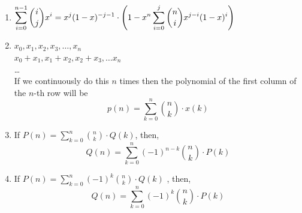 \begin{enumerate}
          \\= n!$\displaystyle \sum_{i=0}^{n} \sum_{j=0}^{k} \left\{ \begin{matrix} k\cr j \end{matrix} \right\} \cdot \frac{1}{(n-i)!} \cdot \frac{1}{(i-j)!}$
          \\= n!$\displaystyle \sum_{i=0}^{n} \sum_{j=0}^{k} \left\{ \begin{matrix} k\cr j \end{matrix} \right\} \cdot { n-j \choose n-i} \cdot \frac{1}{(n-j)!}$
          \\= n!$\displaystyle \sum_{j=0}^{k} \left\{ \begin{matrix} k\cr j \end{matrix} \right\} \cdot \frac{1}{(n-j)!} \sum_{i=0}^{n} \cdot { n-j \choose n-i}$
          \\= $\displaystyle \sum_{j=0}^{k} \left\{\begin{matrix} k\cr j \end{matrix} \right\} \cdot n^{\underline{j}} \cdot 2^{n-j}$

          Here $n^{\underline{j}}=P(n,j)=\dfrac{n!}{(n-j)!}$ and $\displaystyle \left\{ \begin{matrix} k\cr j \end{matrix} \right\}$ is stirling number of the second kind.

          So, instead of $O(n)$, now you can calculate the original equation in $O(k^2)$ or even in $O(k \log^2 n)$ using NTT.
    \item $\displaystyle \displaystyle \sum \limits_{i=0}^{n-1} {i \choose j} x^i = x^j(1-x)^{-j-1} \\ \cdot \left( 1- x^n \sum \limits_{i=0}^j {n \choose i} x^{j-i} (1-x)^i \right)$
    \item $\displaystyle x_{0}, x_{1}, x_{2}, x_{3}, \dots , x_{n}$
          \\ $\displaystyle x_{0} + x_{1}, x_{1} + x_{2}, x_{2}+x_{3}, \dots x_{n}$
          \\ \dots
          \\ If we continuously do this $n$ times then the polynomial of the first column of the $n$-th row will be
          \[\displaystyle p(n)=\sum_{k=0}^{n}{n \choose k} \cdot x(k)\]
    \item If $\displaystyle P(n)=\sum_{k=0}^{n}{n \choose k} \cdot Q(k)$, then,
          \[Q(n)=\sum_{k=0}^{n}(-1)^{n-k}{n \choose k} \cdot P(k)\]
    \item If $\displaystyle P(n)=\sum_{k=0}^{n}(-1)^{k}{n \choose k} \cdot Q(k)$ , then,
          \[Q(n)=\sum_{k=0}^{n}(-1)^{k}{n \choose k} \cdot P(k)\]
\end{enumerate}


